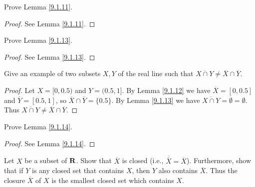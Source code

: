 \begin{exercise}\label{ex 9.1.2}
    Prove Lemma \ref{9.1.11}.
\end{exercise}

\begin{proof}
    See Lemma \ref{9.1.11}.
\end{proof}

\begin{exercise}\label{ex 9.1.3}
    Prove Lemma \ref{9.1.13}.
\end{exercise}

\begin{proof}
    See Lemma \ref{9.1.13}.
\end{proof}

\begin{exercise}\label{ex 9.1.4}
    Give an example of two subsets \(X, Y\) of the real line such that \(\overline{X \cap Y} \neq \overline{X} \cap \overline{Y}\).
\end{exercise}

\begin{proof}
    Let \(X = [0, 0.5)\) and \(Y = (0.5, 1]\).
    By Lemma \ref{9.1.12} we have \(\overline{X} = [0, 0.5]\) and \(\overline{Y} = [0.5, 1]\), so \(\overline{X} \cap \overline{Y} = \{0.5\}\).
    By Lemma \ref{9.1.13} we have \(\overline{X \cap Y} = \overline{\emptyset} = \emptyset\).
    Thus \(\overline{X \cap Y} \neq \overline{X} \cap \overline{Y}\).
\end{proof}

\begin{exercise}\label{ex 9.1.5}
    Prove Lemma \ref{9.1.14}.
\end{exercise}

\begin{proof}
    See Lemma \ref{9.1.14}.
\end{proof}

\begin{exercise}\label{ex 9.1.6}
    Let \(X\) be a subset of \(\mathbf{R}\).
    Show that \(\overline{X}\) is closed (i.e., \(\overline{\overline{X}} = \overline{X}\)).
    Furthermore, show that if \(Y\) is any closed set that contains \(X\), then \(Y\) also contains \(\overline{X}\).
    Thus the closure \(\overline{X}\) of \(X\) is the smallest closed set which contains \(X\).
\end{exercise}

